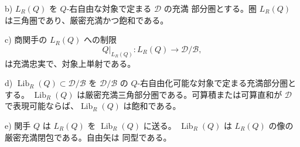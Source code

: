\par\noindent b) $L_R(Q)$ を $Q$-右自由な対象で定まる $\mathcal D$ の充満
部分圏とする。圏 $L_R(Q)$ は三角圏であり、厳密充満かつ飽和である。
\par\noindent c) 商関手の $L_R(Q)$ への制限
\[
  Q|_{L_R(Q)}\colon L_R(Q)\longrightarrow\mathcal D/\mathcal B
  ,
\]
は充満忠実で、対象上単射である。
\par\noindent d) $\operatorname{Lib}_R(Q)\subset\mathcal D/\mathcal B$ を
$\mathcal D/\mathcal B$ の $Q$-右自由化可能な対象で定まる充満部分圏とする。
$\operatorname{Lib}_R(Q)$ は厳密充満三角部分圏である。可算積または可算直和が
$\mathcal D$ で表現可能ならば、$\operatorname{Lib}_R(Q)$ は飽和である。
\par\noindent e) 関手 $Q$ は $L_R(Q)$ を $\operatorname{Lib}_R(Q)$ に送る。
$\operatorname{Lib}_R(Q)$ は $L_R(Q)$ の像の厳密充満閉包である。自由矢は
同型である。
\endgroup
\endgroup
